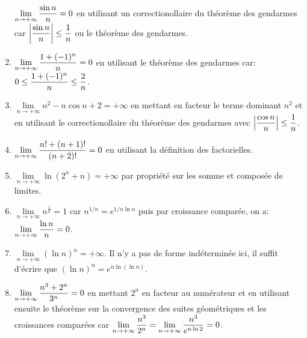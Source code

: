 \documentclass[a4paper, 11pt]{article}
\begin{document}
\begin{correction}
\begin{enumerate}
$\lim \limits_{n\to +\infty}\displaystyle\frac{\sin{n}}{n}=0$ en utilisant un correctionollaire du th\'eor\`eme des gendarmes car $\left| \displaystyle\frac{\sin{n}}{n} \right|\leq \displaystyle\frac{1}{n}$ ou le th\'eor\`{e}me des gendarmes.
\item 
$\lim \limits_{n\to +\infty}\displaystyle\frac{1+(-1)^n}{n}=0$ en utilisant le th\'eor\`eme des gendarmes car: $0\leq \displaystyle\frac{1+(-1)^n}{n}\leq \displaystyle\frac{2}{n}$.
\item
$\lim \limits_{n\to +\infty}n^2-n\cos{n}+2=+\infty$ en mettant en facteur le terme dominant $n^2$ et en utilisant le correctionollaire du th\'eor\`eme des gendarmes avec $\left| \displaystyle\frac{\cos{n}}{n} \right|\leq\displaystyle\frac{1}{n}$.
\item
$\lim \limits_{n\to +\infty}\displaystyle\frac{n!+(n+1)!}{(n+2)!}=0$ en utilisant la d\'efinition des factorielles.
\item
$\lim \limits_{n\to +\infty}\ln{(2^n+n)}=+\infty$ par propri\'et\'e sur les somme et compos\'ee de limites.
\item
$\lim \limits_{n\to +\infty}n^{\frac{1}{n}}=1$ car $n^{1/n}=e^{1/n\ln{n}}$ puis par croissance compar\'ee, on a: $\lim\limits_{n\to +\infty} \displaystyle\frac{\ln{n}}{n}=0$.  
\item
$\lim \limits_{n\to +\infty}(\ln{n})^n=+\infty$. Il n'y a pas de forme ind\'etermin\'ee ici, il suffit d'\'ecrire que $\left( \ln{n}\right)^n=e^{n\ln{(\ln{n})}}$.
\item
$\lim \limits_{n\to +\infty}\displaystyle\frac{n^3+2^n}{3^n}=0$ en mettant $2^n$ en facteur au num\'erateur et en utilisant ensuite le th\'eor\`eme sur la convergence des suites g\'eom\'etriques et les croissances compar\'ees car $\lim\limits_{n\to +\infty} \displaystyle\frac{n^3}{2^n}=\lim\limits_{n\to +\infty} \displaystyle\frac{n^3}{e^{n\ln{2}}}=0$. 

\end{enumerate}
\end{correction}
\end{document}
